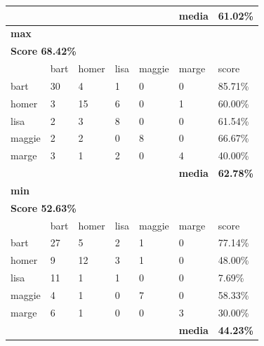\documentclass[journal]{IEEEtran}
\begin{document}
\begin{table}[!htb]
\begin{tabular}{l|l|l|l|l|l|l}
\textbf{} & \textbf{} & \textbf{} & \textbf{} & \textbf{} & \textbf{media} & \textbf{61.02\%} \\ \hline
\multicolumn{7}{l}{\textbf{max}}                                                            \\ \hline
\multicolumn{7}{l}{\textbf{Score 68.42\%}}                                                  \\ \hline
          & bart      & homer     & lisa      & maggie    & marge          & score            \\ \hline
bart      & 30        & 4         & 1         & 0         & 0              & 85.71\%          \\ \hline
homer     & 3         & 15        & 6         & 0         & 1              & 60.00\%          \\ \hline
lisa      & 2         & 3         & 8         & 0         & 0              & 61.54\%          \\ \hline
maggie    & 2         & 2         & 0         & 8         & 0              & 66.67\%          \\ \hline
marge     & 3         & 1         & 2         & 0         & 4              & 40.00\%          \\ \hline
\textbf{} & \textbf{} & \textbf{} & \textbf{} & \textbf{} & \textbf{media} & \textbf{62.78\%} \\ \hline
\multicolumn{7}{l}{\textbf{min}}                                                            \\ \hline
\multicolumn{7}{l}{\textbf{Score 52.63\%}}                                                  \\ \hline
          & bart      & homer     & lisa      & maggie    & marge          & score            \\ \hline
bart      & 27        & 5         & 2         & 1         & 0              & 77.14\%          \\ \hline
homer     & 9         & 12        & 3         & 1         & 0              & 48.00\%          \\ \hline
lisa      & 11        & 1         & 1         & 0         & 0              & 7.69\%           \\ \hline
maggie    & 4         & 1         & 0         & 7         & 0              & 58.33\%          \\ \hline
marge     & 6         & 1         & 0         & 0         & 3              & 30.00\%          \\ \hline
\textbf{} & \textbf{} & \textbf{} & \textbf{} & \textbf{} & \textbf{media} & \textbf{44.23\%} \\ \hline

\end{tabular}
\end{table}
\end{document}
